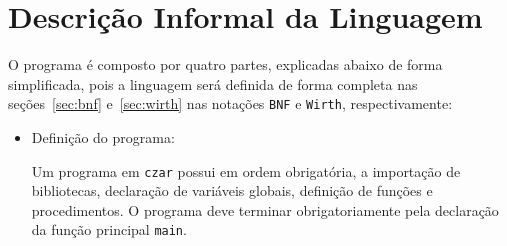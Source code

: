 
\section{Descrição Informal da Linguagem}
\label{sec:desc-informal}

O programa é composto por quatro partes, explicadas abaixo de forma 
simplificada, pois a linguagem será definida de forma completa nas seções~\ref{sec:bnf} e~\ref{sec:wirth} nas notações \verb!BNF! e
\verb!Wirth!, respectivamente:

\begin{itemize}
    \item Definição do programa:
            
            Um programa em \verb!czar! possui em ordem obrigatória, a
            importação de bibliotecas, declaração de variáveis globais,
            definição de funções e procedimentos. O programa deve terminar
            obrigatoriamente pela declaração da função principal \verb!main!.


\end{itemize}
